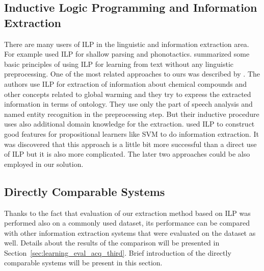 



\subsection{Inductive Logic Programming and Information Extraction}

There are many users of ILP in the linguistic and information extraction area.
For example \cite{stasinos:phd} used ILP for shallow parsing and phonotactics.
\cite{Junker99learningfor} summarized some basic principles of using ILP for learning from text without any linguistic preprocessing. One of the most related approaches to ours was described by \cite{aitken02:_learn_infor_extrac_rules}. The authors use ILP for extraction of information about chemical compounds and other concepts related to global warming and they try to express the extracted information in terms of ontology. They use only the part of speech analysis and named entity recognition in the preprocessing step. But their inductive procedure uses also additional domain knowledge for the extraction. \cite{DBLP:conf/ilp/RamakrishnanJBS07} used ILP to construct good features for propositional learners like SVM to do information extraction. It was discovered that this approach is a little bit more successful than a direct use of ILP but it is also more complicated. The later two approaches could be also employed in our solution.


\subsection{Directly Comparable Systems} \label{sec:relwork_directly_comparable}

Thanks to the fact that evaluation of our extraction method based on ILP was performed also on a commonly used dataset, its performance can be compared with other information extraction systems that were evaluated on the dataset as well. Details about the results of the comparison will be presented in Section~\ref{sec:learning_eval_acq_third}. Brief introduction of the directly comparable systems will be present in this section.

